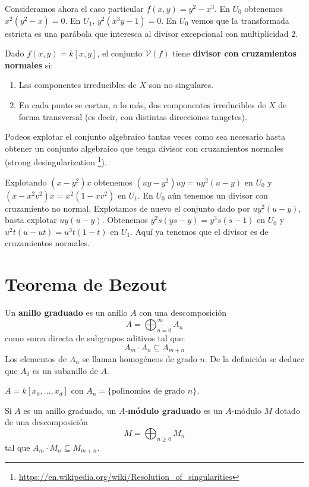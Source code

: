 \documentclass[ACGA.tex]{subfiles}
\begin{document}
Consideramos ahora el caso particular $f(x,y) = y^2-x^3$. En $U_0$ obtenemos $x^2(y^2-x) = 0$. En $U_1$, $y^2(x^3y-1) = 0$. En $U_0$ vemos que la transformada estricta es una parábola que interesca al divisor excepcional con multiplicidad $2$.

\begin{defi}
Dado $f(x,y) = k[x,y]$, el conjunto $\mathcal{V}(f)$ tiene \textbf{divisor con cruzamientos normales} si:
\begin{enumerate}
	\item Las componentes irreducibles de $X$ son no singulares.
	\item En cada punto se cortan, a lo más, dos componentes irreducibles de $X$ de forma transversal (es decir, con distintas direcciones tangetes).
\end{enumerate}
\end{defi}

Podeos explotar el conjunto algebraico tantas veces como sea necesario hasta obtener un conjunto algebraico que tenga divisor con cruzamientos normales (strong desingularization \footnote{\url{https://en.wikipedia.org/wiki/Resolution_of_singularities}}).
\begin{ej}
Explotando $(x-y^2)x$ obtenemos $(uy-y^2)uy=uy^2(u-y)$ en $U_0$ y $(x-x^2v^2)x=x^2(1-xv^2)$ en $U_1$. En $U_0$ aún tenemos un divisor con cruzamiento no normal. Explotamos de nuevo el conjunto dado por $uy^2(u-y)$, basta explotar $uy(u-y)$. Obtenemos $y^2s(ys-y)=y^3s(s-1)$ en $U_0$ y $u^2t(u-ut)=u^3t(1-t)$ en $U_1$. Aquí ya tenemos que el divisor es de cruzamientos normales.
\end{ej}

\section{Teorema de Bezout}
\begin{defi}
Un \textbf{anillo graduado} es un anillo $A$ con una descomposición 
\[ A = \bigoplus_{n=0}^{∞} A_n \]
como suma directa de subgrupos aditivos tal que:
\[ A_m \cdot A_n \subseteq A_{m+n} \]
Los elementos de $A_n$ se llaman homogéneos de grado $n$. De la definición se deduce que $A_0$ es un subanillo de $A$.
\end{defi}

\begin{ej}
$A = k[x_0,\dots,x_d]$ con $A_n = \{\text{polinomios de grado }n\}$.
\end{ej}

\begin{defi}
Si $A$ es un anillo graduado, un $A$-\textbf{módulo graduado} es un $A$-módulo $M$ dotado de una descomposición
\[ M = \bigoplus_{n≥0} M_n \]
tal que $A_m \cdot M_n \subseteq M_{m+n}$.
\end{defi}
\end{document}
